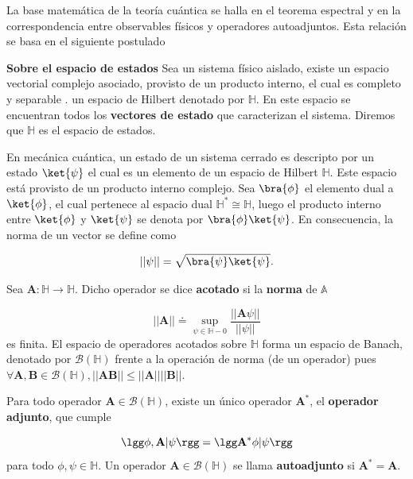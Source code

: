 La base matemática de la teoría cuántica se halla en el teorema espectral y en la correspondencia entre observables físicos y operadores autoadjuntos. Esta relación se basa en el siguiente postulado

\begin{post}\textbf{Sobre el espacio de estados}
Sea un sistema físico aislado, existe un espacio vectorial complejo asociado, provisto de un producto interno, el cual es completo y separable \ie. un espacio de Hilbert denotado por $\mathbb{H}$. En este espacio se encuentran todos los \textbf{vectores de estado} que caracterizan el sistema. Diremos que $\mathbb{H}$ es el espacio de estados. 
\label{Post state space}
\end{post}

En mecánica cuántica, un estado de un sistema cerrado es descripto por un estado $\ket{\psi}$ el cual es un elemento de un espacio de Hilbert $\mathbb{H}$. Este espacio está provisto de un producto interno complejo. Sea $\bra{\phi}$ el elemento dual a $\ket{\phi}$, el cual pertenece al espacio dual $\mathds{H}^{*} \cong \mathds{H}$, luego el producto interno entre $\ket{\phi}$ y $\ket{\psi}$ se denota por $\bra{\phi} \ket {\psi}$. En consecuencia, la norma de un vector se define como 

\begin{equation}
    ||\psi|| = \sqrt{\bra{\psi} \ket {\psi}}.
\end{equation}

Sea $\mathbf{A} : \mathds{H} \rightarrow \mathds{H}$. Dicho operador se dice \textbf{acotado} si la \textbf{norma} de $\mathbb{A}$ 

\begin{equation}
    ||\mathbf{A}|| \doteq \sup_{\psi \in \mathds{H}-{0}} \frac{||\mathbf{A} \psi||}{||\psi||}
\end{equation}
es finita. El espacio de operadores acotados sobre $\mathds{H}$ forma un espacio de Banach, denotado por $\mathcal{B}(\mathds{H})$ frente a la operación de norma (de un operador) pues $\forall\mathbf{A}, \mathbf{B} \in \mathcal{B}(\mathbb{H}), || \mathbf{A}\mathbf{B} || \leq || \mathbf{A}|| ||\mathbf{B}||$.

Para todo operador $\mathbf{A} \in \mathcal{B}(\mathbb{H})$, existe un único operador $\mathbf{A}^{*}$, el \textbf{operador adjunto}, que cumple

\begin{equation}
    \lgg \phi, \mathbf{A} | \psi \rgg = \lgg \mathbf{A}^{*} \phi| \psi\rgg 
\end{equation}
para todo $\phi, \psi \in \mathbb{H}$. Un operador $\mathbf{A} \in \mathcal{B}(\mathbb{H}) $ se llama \textbf{autoadjunto} si $\mathbf{A}^{*} = \mathbf{A}$.

